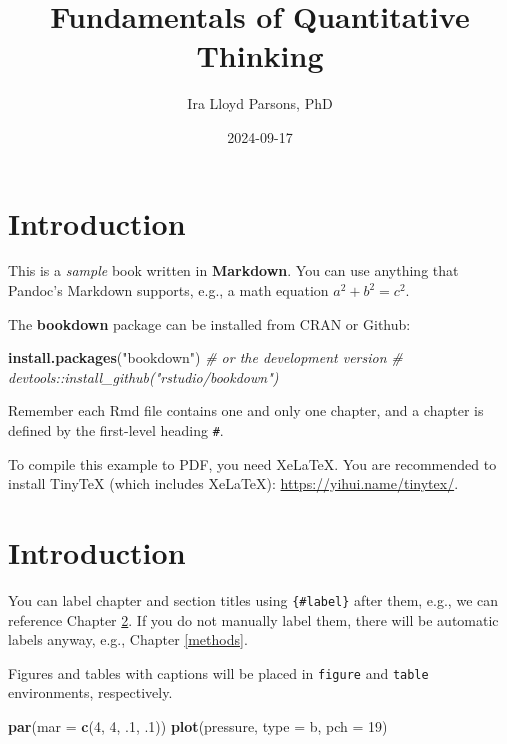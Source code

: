 \documentclass[
]{book}
\title{Fundamentals of Quantitative Thinking}
\author{Ira Lloyd Parsons, PhD}
\date{2024-09-17}
\newenvironment{Shaded}{\begin{snugshade}}{\end{snugshade}}
\newcommand{\AttributeTok}[1]{\textcolor[rgb]{0.13,0.29,0.53}{#1}}
\newcommand{\CommentTok}[1]{\textcolor[rgb]{0.56,0.35,0.01}{\textit{#1}}}
\newcommand{\DecValTok}[1]{\textcolor[rgb]{0.00,0.00,0.81}{#1}}
\newcommand{\FunctionTok}[1]{\textcolor[rgb]{0.13,0.29,0.53}{\textbf{#1}}}
\newcommand{\NormalTok}[1]{#1}
\newcommand{\StringTok}[1]{\textcolor[rgb]{0.31,0.60,0.02}{#1}}
\begin{document}
\maketitle

{
\setcounter{tocdepth}{1}
\tableofcontents
}
\chapter{Introduction}\label{introduction}

This is a \emph{sample} book written in \textbf{Markdown}. You can use anything that Pandoc's Markdown supports, e.g., a math equation \(a^2 + b^2 = c^2\).

The \textbf{bookdown} package can be installed from CRAN or Github:

\begin{Shaded}
\begin{Highlighting}[]
\FunctionTok{install.packages}\NormalTok{(}\StringTok{"bookdown"}\NormalTok{)}
\CommentTok{\# or the development version}
\CommentTok{\# devtools::install\_github("rstudio/bookdown")}
\end{Highlighting}
\end{Shaded}

Remember each Rmd file contains one and only one chapter, and a chapter is defined by the first-level heading \texttt{\#}.

To compile this example to PDF, you need XeLaTeX. You are recommended to install TinyTeX (which includes XeLaTeX): \url{https://yihui.name/tinytex/}.

\chapter{Introduction}\label{intro}

You can label chapter and section titles using \texttt{\{\#label\}} after them, e.g., we can reference Chapter \ref{intro}. If you do not manually label them, there will be automatic labels anyway, e.g., Chapter \ref{methods}.

Figures and tables with captions will be placed in \texttt{figure} and \texttt{table} environments, respectively.

\begin{Shaded}
\begin{Highlighting}[]
\FunctionTok{par}\NormalTok{(}\AttributeTok{mar =} \FunctionTok{c}\NormalTok{(}\DecValTok{4}\NormalTok{, }\DecValTok{4}\NormalTok{, .}\DecValTok{1}\NormalTok{, .}\DecValTok{1}\NormalTok{))}
\FunctionTok{plot}\NormalTok{(pressure, }\AttributeTok{type =} \StringTok{\textquotesingle{}b\textquotesingle{}}\NormalTok{, }\AttributeTok{pch =} \DecValTok{19}\NormalTok{)}
\end{Highlighting}
\end{Shaded}
\end{document}
